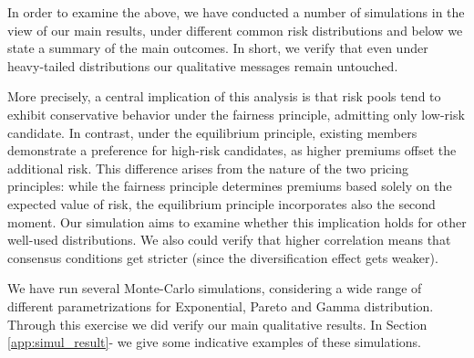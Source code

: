 \documentclass[fleqn,mnsc,nonblindrev]{informs4}
\begin{document}
In order to examine the above, we have conducted a number of simulations in the view of our main results, under different common risk distributions and below we state a summary of the main outcomes. In short, we verify that even under heavy-tailed distributions our qualitative messages remain untouched.

More precisely, a central implication of this analysis is that risk pools tend to exhibit conservative behavior under the fairness principle, admitting only low-risk candidate. In contrast, under the equilibrium principle, existing members demonstrate a preference for high-risk candidates, as higher premiums offset the additional risk. This difference arises from the nature of the two pricing principles: while the fairness principle determines premiums based solely on the expected value of risk, the equilibrium principle incorporates also the second moment. Our simulation aims to examine whether this implication holds for other well-used distributions. We also could verify that higher correlation means that consensus conditions get stricter (since the diversification effect gets weaker).

We have run several Monte-Carlo simulations, considering a wide range of different parametrizations for Exponential, Pareto and Gamma distribution. Through this exercise we did verify our main qualitative results. In Section \ref{app:simul_result}- we give some indicative examples of these simulations.
\end{document}
